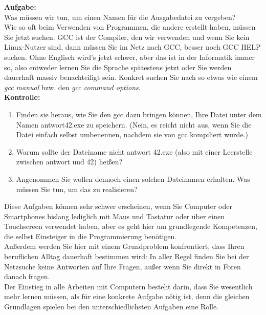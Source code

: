 \textbf{Aufgabe:}\\

Was müssen wir tun, um einen Namen für die Ausgabedatei zu vergeben?\\

Wie so oft beim Verwenden von Programmen, die andere erstellt haben, müssen Sie jetzt suchen. GCC ist der Compiler, den wir verwenden und wenn Sie kein Linux-Nutzer sind, dann müssen Sie im Netz nach GCC, besser noch GCC HELP suchen. Ohne Englisch wird’s jetzt schwer, aber das ist in der Informatik immer so, also entweder lernen Sie die Sprache spätestens jetzt oder Sie werden dauerhaft massiv benachteiligt sein. Konkret suchen Sie nach so etwas wie einem \emph{gcc manual} bzw. den \emph{gcc command options}.\\

\textbf{Kontrolle:}

\begin{enumerate}
	\item Finden sie heraus, wie Sie den gcc dazu bringen können, Ihre Datei unter dem Namen antwort42.exe zu speichern. (Nein, es reicht nicht aus, wenn Sie die Datei einfach selbst umbenennen, nachdem sie von gcc kompiliert wurde.)
	
	\item Warum sollte der Dateiname nicht antwort 42.exe (also mit einer Leerstelle zwischen antwort und 42) heißen?
	
	\item Angenommen Sie wollen dennoch einen solchen Dateinamen erhalten. Was müssen Sie tun, um das zu realisieren?
\end{enumerate}

Diese Aufgaben können sehr schwer erscheinen, wenn Sie Computer oder Smartphones bislang lediglich mit Maus und Tastatur oder über einen Touchscreen verwendet haben, aber es geht hier um grundlegende Kompetenzen, die selbst Einsteiger in die Programmierung benötigen.\\

Außerdem werden Sie hier mit einem Grundproblem konfrontiert, dass Ihren beruflichen Alltag dauerhaft bestimmen wird: In aller Regel finden Sie bei der Netzsuche keine Antworten auf Ihre Fragen, außer wenn Sie direkt in Foren danach fragen.\\

Der Einstieg in alle Arbeiten mit Computern besteht darin, dass Sie wesentlich mehr lernen müssen, als für eine konkrete Aufgabe nötig ist, denn die gleichen Grundlagen spielen bei den unterschiedlichsten Aufgaben eine Rolle.

